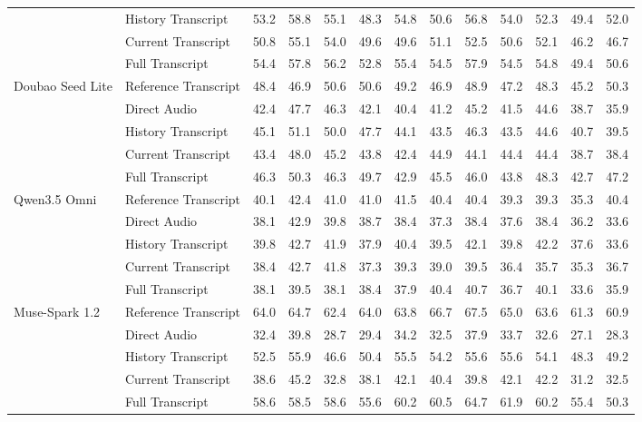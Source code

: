 \begin{table}[htbp]
\begin{tabular*}{\linewidth}{@{}ll@{\extracolsep{\fill}}*{11}{r}@{}}
 & History Transcript & 53.2 & 58.8 & 55.1 & 48.3 & 54.8 & 50.6 & 56.8 & 54.0 & 52.3 & 49.4 & 52.0 \\
 & Current Transcript & 50.8 & 55.1 & 54.0 & 49.6 & 49.6 & 51.1 & 52.5 & 50.6 & 52.1 & 46.2 & 46.7 \\
 & Full Transcript & 54.4 & 57.8 & 56.2 & 52.8 & 55.4 & 54.5 & 57.9 & 54.5 & 54.8 & 49.4 & 50.6 \\
\addlinespace[1pt]
\midrule
Doubao Seed Lite & Reference Transcript & 48.4 & 46.9 & 50.6 & 50.6 & 49.2 & 46.9 & 48.9 & 47.2 & 48.3 & 45.2 & 50.3 \\
 & Direct Audio & 42.4 & 47.7 & 46.3 & 42.1 & 40.4 & 41.2 & 45.2 & 41.5 & 44.6 & 38.7 & 35.9 \\
 & History Transcript & 45.1 & 51.1 & 50.0 & 47.7 & 44.1 & 43.5 & 46.3 & 43.5 & 44.6 & 40.7 & 39.5 \\
 & Current Transcript & 43.4 & 48.0 & 45.2 & 43.8 & 42.4 & 44.9 & 44.1 & 44.4 & 44.4 & 38.7 & 38.4 \\
 & Full Transcript & 46.3 & 50.3 & 46.3 & 49.7 & 42.9 & 45.5 & 46.0 & 43.8 & 48.3 & 42.7 & 47.2 \\
\addlinespace[1pt]
\midrule
Qwen3.5 Omni & Reference Transcript & 40.1 & 42.4 & 41.0 & 41.0 & 41.5 & 40.4 & 40.4 & 39.3 & 39.3 & 35.3 & 40.4 \\
 & Direct Audio & 38.1 & 42.9 & 39.8 & 38.7 & 38.4 & 37.3 & 38.4 & 37.6 & 38.4 & 36.2 & 33.6 \\
 & History Transcript & 39.8 & 42.7 & 41.9 & 37.9 & 40.4 & 39.5 & 42.1 & 39.8 & 42.2 & 37.6 & 33.6 \\
 & Current Transcript & 38.4 & 42.7 & 41.8 & 37.3 & 39.3 & 39.0 & 39.5 & 36.4 & 35.7 & 35.3 & 36.7 \\
 & Full Transcript & 38.1 & 39.5 & 38.1 & 38.4 & 37.9 & 40.4 & 40.7 & 36.7 & 40.1 & 33.6 & 35.9 \\
\addlinespace[1pt]
\midrule
Muse-Spark 1.2 & Reference Transcript & 64.0 & 64.7 & 62.4 & 64.0 & 63.8 & 66.7 & 67.5 & 65.0 & 63.6 & 61.3 & 60.9 \\
 & Direct Audio & 32.4 & 39.8 & 28.7 & 29.4 & 34.2 & 32.5 & 37.9 & 33.7 & 32.6 & 27.1 & 28.3 \\
 & History Transcript & 52.5 & 55.9 & 46.6 & 50.4 & 55.5 & 54.2 & 55.6 & 55.6 & 54.1 & 48.3 & 49.2 \\
 & Current Transcript & 38.6 & 45.2 & 32.8 & 38.1 & 42.1 & 40.4 & 39.8 & 42.1 & 42.2 & 31.2 & 32.5 \\
 & Full Transcript & 58.6 & 58.5 & 58.6 & 55.6 & 60.2 & 60.5 & 64.7 & 61.9 & 60.2 & 55.4 & 50.3 \\
\bottomrule
\end{tabular*}
\endgroup
\end{table}
